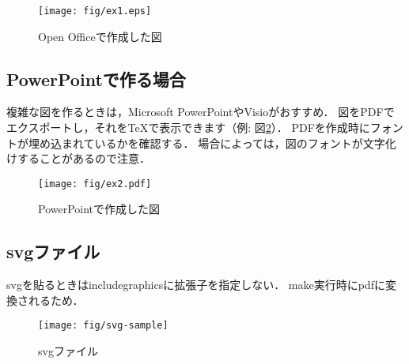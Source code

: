 \documentclass[submit,techreq,noauthor,dvipdfmx]{eco}	%
\begin{document}
\begin{figure}[t]
	\centering
	\texttt{[image: fig/ex1.eps]}
	\caption{Open Officeで作成した図}
	\label{fig:tgif-sample}
\end{figure}


\subsection{PowerPointで作る場合}
複雑な図を作るときは，Microsoft PowerPointやVisioがおすすめ．
図をPDFでエクスポートし，それをTeXで表示できます（例: 図\ref{fig:pdf-sample}）．
PDFを作成時にフォントが埋め込まれているかを確認する．
場合によっては，図のフォントが文字化けすることがあるので注意．

\begin{figure}[t]
	\centering
	\texttt{[image: fig/ex2.pdf]}
	\caption{PowerPointで作成した図}
	\label{fig:pdf-sample}
\end{figure}

\subsection{svgファイル}
svgを貼るときはincludegraphicsに拡張子を指定しない．
make実行時にpdfに変換されるため．
\begin{figure}[t]
	\centering\texttt{[image: fig/svg-sample]}
	\caption{svgファイル}\label{fig:svg-sample}
\end{figure}


\setlength\baselineskip{12pt}
{\small
	
	
}
\end{document}
